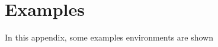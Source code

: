 \documentclass[../main.tex]{subfiles}
\begin{document}
\chapter{Examples}\label{app:examples}
In this appendix, some examples environments are shown


\end{document}
